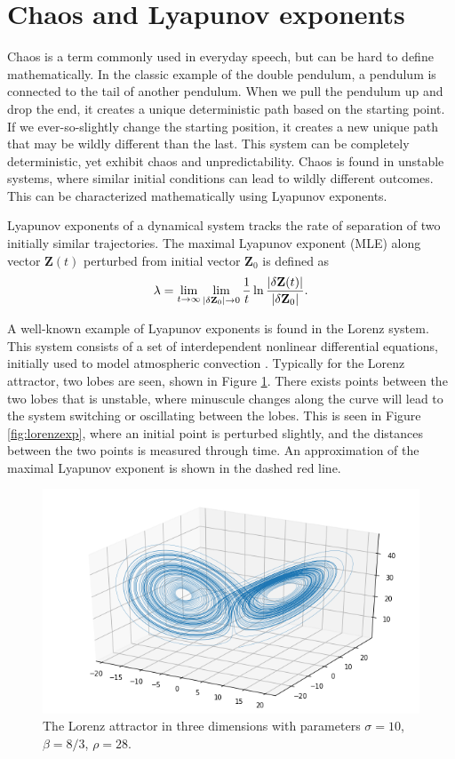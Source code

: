 \section{Chaos and Lyapunov exponents}
Chaos is a term commonly used in everyday speech, but can be hard to define mathematically. In the classic example of the double pendulum, a pendulum is connected to the tail of another pendulum. When we pull the pendulum up and drop the end, it creates a unique deterministic path based on the starting point. If we ever-so-slightly change the starting position, it creates a new unique path that may be wildly different than the last. This system can be completely deterministic, yet exhibit chaos and unpredictability. Chaos is found in unstable systems, where similar initial conditions can lead to wildly different outcomes. This can be characterized mathematically using Lyapunov exponents. 

Lyapunov exponents of a dynamical system tracks the rate of separation of two initially similar trajectories. The maximal Lyapunov exponent (MLE) along vector $\mathbf{Z}(t)$ perturbed from initial vector $\mathbf{Z}_0$ is defined as \begin{equation}
	\lambda = \lim_{t \to \infty} \lim_{\abs{\delta \mathbf{Z}_0} \to 0} \frac{1}{t} \ln\frac{\abs{\delta \mathbf{Z}(t)}}{\abs{\delta \mathbf{Z}_0}}.
\end{equation}

A well-known example of Lyapunov exponents is found in the Lorenz system. This system consists of a set of interdependent nonlinear differential equations, initially used to model atmospheric convection \cite{DeterministicNonperiodicFlow}. Typically for the Lorenz attractor, two lobes are seen, shown in Figure \ref{fig:lorenzattractor}. There exists points between the two lobes that is unstable, where minuscule changes along the curve will lead to the system switching or oscillating between the lobes. This is seen in Figure \ref{fig:lorenzexp}, where an initial point is perturbed slightly, and the distances between the two points is measured through time. An approximation of the maximal Lyapunov exponent is shown in the dashed red line. 

\begin{figure}[p]
	\centering
	\includegraphics[width=0.7\linewidth]{chapter2/lorenzattractor}
	\caption[Three-dimensional plot of the Lorenz system.]{The Lorenz attractor in three dimensions with parameters $\sigma = 10$, $\beta = 8/3$, $\rho = 28$.}
	\label{fig:lorenzattractor}
\end{figure}

